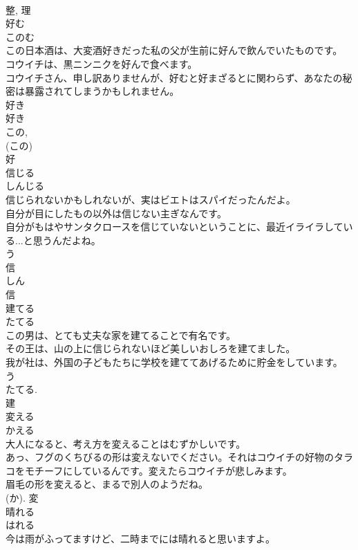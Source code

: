 \documentclass[8pt]{extreport}
\begin{document}
\begin{CJK}{UTF8}{min}
\\	整, 理	
\\	好む	
\\	このむ	
\\	この日本酒は、大変酒好きだった私の父が生前に好んで飲んでいたものです。	
\\	コウイチは、黒ニンニクを好んで食べます。	
\\	コウイチさん、申し訳ありませんが、好むと好まざるとに関わらず、あなたの秘密は暴露されてしまうかもしれません。	
\\	好き 
\\	好き 
\\	この, 
\\	(この) 
\\	好	
\\	信じる	
\\	しんじる	
\\	信じられないかもしれないが、実はビエトはスパイだったんだよ。	
\\	自分が目にしたもの以外は信じない主ぎなんです。	
\\	自分がもはやサンタクロースを信じていないということに、最近イライラしている...と思うんだよね。	
\\	う 
\\	信 
\\	しん 
\\	信	
\\	建てる	
\\	たてる	
\\	この男は、とても丈夫な家を建てることで有名です。	
\\	その王は、山の上に信じられないほど美しいおしろを建てました。	
\\	我が社は、外国の子どもたちに学校を建ててあげるために貯金をしています。	
\\	う 
\\	たてる. 
\\	建	
\\	変える	
\\	かえる	
\\	大人になると、考え方を変えることはむずかしいです。	
\\	あっ、フグのくちびるの形は変えないでください。それはコウイチの好物のタラコをモチーフにしているんです。変えたらコウイチが悲しみます。	
\\	眉毛の形を変えると、まるで別人のようだね。	
\\	(か).	変	
\\	晴れる	
\\	はれる	
\\	今は雨がふってますけど、二時までには晴れると思いますよ。	

\end{CJK}
\end{document}

